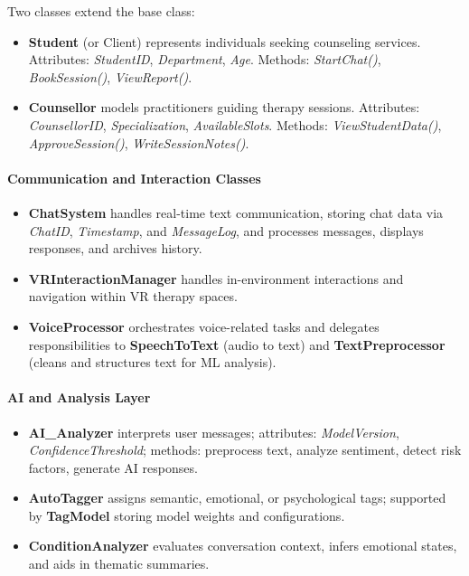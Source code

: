 Two classes extend the base class:
\begin{itemize}
    \item \textbf{Student} (or Client) represents individuals seeking counseling services. Attributes: \textit{StudentID}, \textit{Department}, \textit{Age}. Methods: \textit{StartChat()}, \textit{BookSession()}, \textit{ViewReport()}.
    \item \textbf{Counsellor} models practitioners guiding therapy sessions. Attributes: \textit{CounsellorID}, \textit{Specialization}, \textit{AvailableSlots}. Methods: \textit{ViewStudentData()}, \textit{ApproveSession()}, \textit{WriteSessionNotes()}.
\end{itemize}

\paragraph{Communication and Interaction Classes}
\begin{itemize}
    \item \textbf{ChatSystem} handles real-time text communication, storing chat data via \textit{ChatID}, \textit{Timestamp}, and \textit{MessageLog}, and processes messages, displays responses, and archives history.
    \item \textbf{VRInteractionManager} handles in-environment interactions and navigation within VR therapy spaces.
    \item \textbf{VoiceProcessor} orchestrates voice-related tasks and delegates responsibilities to \textbf{SpeechToText} (audio to text) and \textbf{TextPreprocessor} (cleans and structures text for ML analysis).
\end{itemize}

\paragraph{AI and Analysis Layer}
\begin{itemize}
    \item \textbf{AI\_Analyzer} interprets user messages; attributes: \textit{ModelVersion}, \textit{ConfidenceThreshold}; methods: preprocess text, analyze sentiment, detect risk factors, generate AI responses.
    \item \textbf{AutoTagger} assigns semantic, emotional, or psychological tags; supported by \textbf{TagModel} storing model weights and configurations.
    \item \textbf{ConditionAnalyzer} evaluates conversation context, infers emotional states, and aids in thematic summaries.
\end{itemize}

